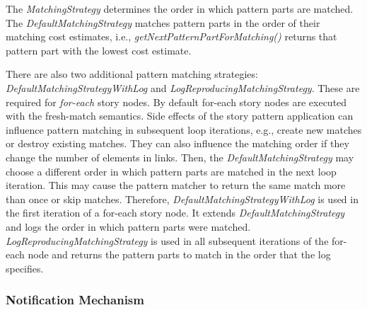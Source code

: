 \begin{enumerate}
\end{enumerate}


The \emph{MatchingStrategy} determines the order in which pattern parts are matched. The \emph{DefaultMatchingStrategy} matches pattern parts in the order of their matching cost estimates, i.e., \emph{getNextPatternPartForMatching()} returns that pattern part with the lowest cost estimate. 

There are also two additional pattern matching strategies: \emph{DefaultMatchingStrategyWithLog} and \emph{LogReproducingMatchingStrategy}. These are required for \emph{for-each} story nodes. By default for-each story nodes are executed with the fresh-match semantics. Side effects of the story pattern application can influence pattern matching in subsequent loop iterations, e.g., create new matches or destroy existing matches. They can also influence the matching order if they change the number of elements in links. Then, the \emph{DefaultMatchingStrategy} may choose a different order in which pattern parts are matched in the next loop iteration. This may cause the pattern matcher to return the same match more than once or skip matches. Therefore, \emph{DefaultMatchingStrategyWithLog} is used in the first iteration of a for-each story node. It extends \emph{DefaultMatchingStrategy} and logs the order in which pattern parts were matched. \emph{LogReproducingMatchingStrategy} is used in all subsequent iterations of the for-each node and returns the pattern parts to match in the order that the log specifies.

\subsubsection{Notification Mechanism}
\label{sec:notification_mechanism}

